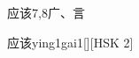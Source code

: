 \begin{entry}{应该}{7,8}{⼴、⾔}
  \begin{phonetics}{应该}{ying1gai1}[][HSK 2]
  \end{phonetics}
\end{entry}

